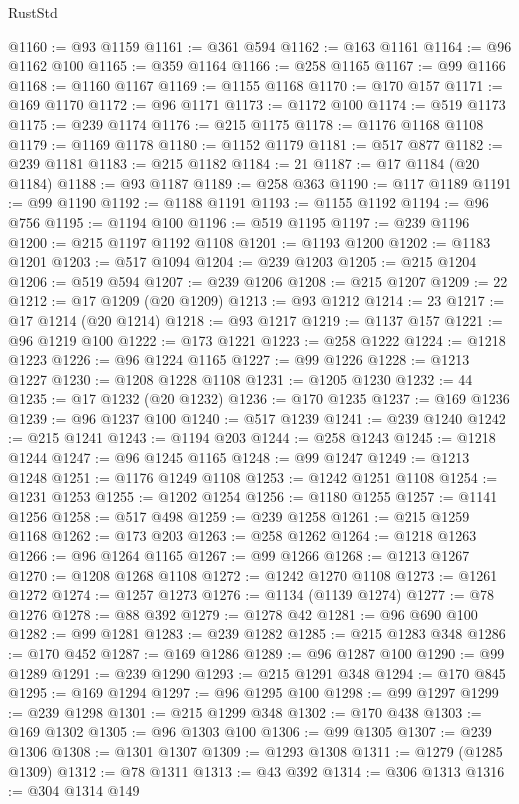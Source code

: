 \begin{lexlean}{RustStd}
\begin{coremodule}
@1160 := @93 @1159
@1161 := @361 @594
@1162 := @163 @1161
@1164 := @96 @1162 @100
@1165 := @359 @1164
@1166 := @258 @1165
@1167 := @99 @1166
@1168 := @1160 @1167
@1169 := @1155 @1168
@1170 := @170 @157
@1171 := @169 @1170
@1172 := @96 @1171
@1173 := @1172 @100
@1174 := @519 @1173
@1175 := @239 @1174
@1176 := @215 @1175
@1178 := @1176 @1168 @1108
@1179 := @1169 @1178
@1180 := @1152 @1179
@1181 := @517 @877
@1182 := @239 @1181
@1183 := @215 @1182
@1184 := 21
@1187 := @17 @1184 (@20 @1184)
@1188 := @93 @1187
@1189 := @258 @363
@1190 := @117 @1189
@1191 := @99 @1190
@1192 := @1188 @1191
@1193 := @1155 @1192
@1194 := @96 @756
@1195 := @1194 @100
@1196 := @519 @1195
@1197 := @239 @1196
@1200 := @215 @1197 @1192 @1108
@1201 := @1193 @1200
@1202 := @1183 @1201
@1203 := @517 @1094
@1204 := @239 @1203
@1205 := @215 @1204
@1206 := @519 @594
@1207 := @239 @1206
@1208 := @215 @1207
@1209 := 22
@1212 := @17 @1209 (@20 @1209)
@1213 := @93 @1212
@1214 := 23
@1217 := @17 @1214 (@20 @1214)
@1218 := @93 @1217
@1219 := @1137 @157
@1221 := @96 @1219 @100
@1222 := @173 @1221
@1223 := @258 @1222
@1224 := @1218 @1223
@1226 := @96 @1224 @1165
@1227 := @99 @1226
@1228 := @1213 @1227
@1230 := @1208 @1228 @1108
@1231 := @1205 @1230
@1232 := 44
@1235 := @17 @1232 (@20 @1232)
@1236 := @170 @1235
@1237 := @169 @1236
@1239 := @96 @1237 @100
@1240 := @517 @1239
@1241 := @239 @1240
@1242 := @215 @1241
@1243 := @1194 @203
@1244 := @258 @1243
@1245 := @1218 @1244
@1247 := @96 @1245 @1165
@1248 := @99 @1247
@1249 := @1213 @1248
@1251 := @1176 @1249 @1108
@1253 := @1242 @1251 @1108
@1254 := @1231 @1253
@1255 := @1202 @1254
@1256 := @1180 @1255
@1257 := @1141 @1256
@1258 := @517 @498
@1259 := @239 @1258
@1261 := @215 @1259 @1168
@1262 := @173 @203
@1263 := @258 @1262
@1264 := @1218 @1263
@1266 := @96 @1264 @1165
@1267 := @99 @1266
@1268 := @1213 @1267
@1270 := @1208 @1268 @1108
@1272 := @1242 @1270 @1108
@1273 := @1261 @1272
@1274 := @1257 @1273
@1276 := @1134 (@1139 @1274)
@1277 := @78 @1276
@1278 := @88 @392
@1279 := @1278 @42
@1281 := @96 @690 @100
@1282 := @99 @1281
@1283 := @239 @1282
@1285 := @215 @1283 @348
@1286 := @170 @452
@1287 := @169 @1286
@1289 := @96 @1287 @100
@1290 := @99 @1289
@1291 := @239 @1290
@1293 := @215 @1291 @348
@1294 := @170 @845
@1295 := @169 @1294
@1297 := @96 @1295 @100
@1298 := @99 @1297
@1299 := @239 @1298
@1301 := @215 @1299 @348
@1302 := @170 @438
@1303 := @169 @1302
@1305 := @96 @1303 @100
@1306 := @99 @1305
@1307 := @239 @1306
@1308 := @1301 @1307
@1309 := @1293 @1308
@1311 := @1279 (@1285 @1309)
@1312 := @78 @1311
@1313 := @43 @392
@1314 := @306 @1313
@1316 := @304 @1314 @149

\end{coremodule}
\end{lexlean}
